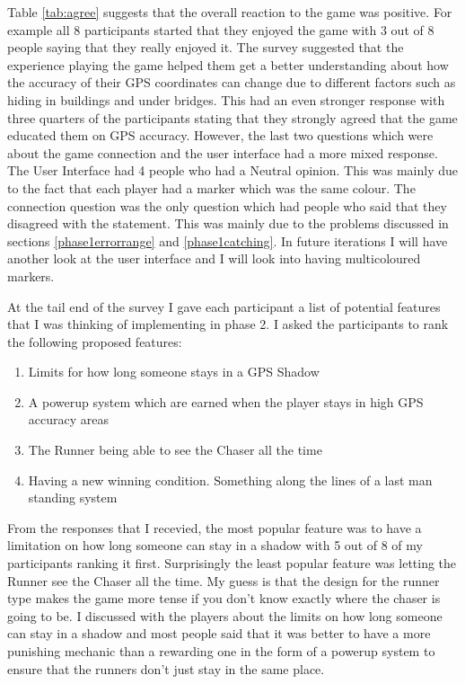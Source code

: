 \documentclass{l4proj}
\begin{document}
Table \ref{tab:agree} suggests that the overall reaction to the game was positive. For example all 8 participants started
that they enjoyed the game with 3 out of 8 people saying that they really enjoyed it. The survey suggested that the experience
playing the game helped them get a better understanding about how the accuracy of their GPS coordinates can change due to different
factors such as hiding in buildings and under bridges. This had an even stronger response with three quarters of the participants
stating that they strongly agreed that the game educated them on GPS accuracy. However, the last two questions which were
about the game connection and the user interface had a more mixed response. The User Interface had 4 people who had a Neutral
opinion. This was mainly due to the fact that each player had a marker which was the same colour. The connection question
was the only question which had people who said that they disagreed with the statement. This was mainly due to the problems discussed
in sections \ref{phase1errorrange} and \ref{phase1catching}. In future iterations I will have another look at the user interface
and I will look into having multicoloured markers.

At the tail end of the survey I gave each participant a list of potential features that I was thinking of implementing in phase 2.
I asked the participants to rank the following proposed features:

\begin{enumerate}
    \item Limits for how long someone stays in a GPS Shadow
    \item A powerup system which are earned when the player stays in high GPS accuracy areas
    \item The Runner being able to see the Chaser all the time
    \item Having a new winning condition. Something along the lines of a last man standing system
\end{enumerate}

From the responses that I recevied, the most popular feature was to have a limitation on how long someone can stay in a shadow with
5 out of 8 of my participants ranking it first. Surprisingly the least popular feature was letting the Runner see the Chaser all the time.
My guess is that the design for the runner type makes the game more tense if you don't know exactly where the chaser is going to be.
I discussed with the players about the limits on how long someone can stay in a shadow and most people said that it was better to have
a more punishing mechanic than a rewarding one in the form of a powerup system to ensure that the runners don't just stay in the same place.
\end{document}
